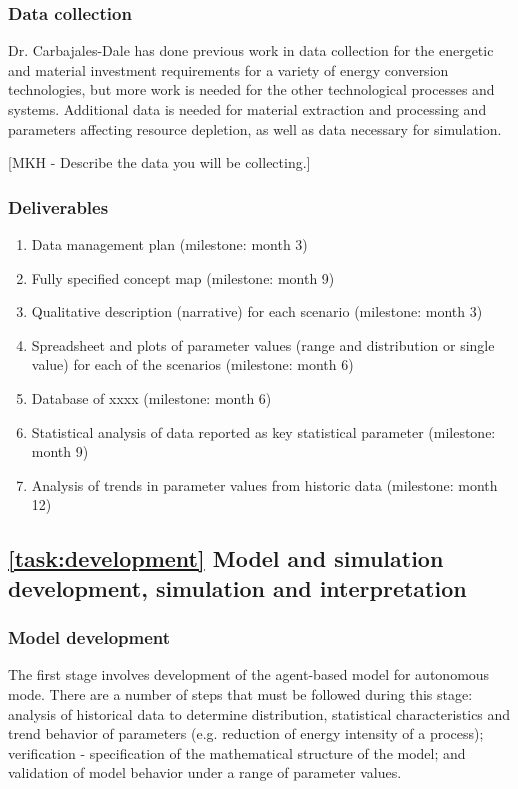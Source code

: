 \documentclass[11pt,a4paper]{article}
\begin{document}
\subsubsection{Data collection}

Dr. Carbajales-Dale has done previous work in 
data collection for the energetic and material investment requirements 
for a variety of energy conversion technologies, 
but more work is needed for the other 
technological processes and systems. 
Additional data is needed for material extraction and processing
and parameters affecting resource depletion,
as well as data necessary for simulation.

[MKH - Describe the data you will be collecting.]


\subsubsection{Deliverables}
\begin{enumerate}
\vspace{-9pt}
\setlength{\itemsep}{-3pt}
	\item	Data management plan (milestone: month 3)
	\item	Fully specified concept map (milestone: month 9)
	\item	Qualitative description (narrative) for each scenario (milestone: month 3)
	\item	Spreadsheet and plots of parameter values 
				(range and distribution or single value) 
				for each of the scenarios (milestone: month 6)
	\item	Database of xxxx (milestone: month 6)
	\item	Statistical analysis of data reported as key statistical parameter (milestone: month 9)
	\item	Analysis of trends in parameter values from historic data (milestone: month 12)
\end{enumerate}

\subsection{\ref{task:development} Model and simulation development, simulation and interpretation}
\label{sec:task:development}


\subsubsection{Model development}

The first stage involves 
development of the agent-based model for autonomous mode.
There are a number of steps 
that must be followed during this stage: 
analysis of historical data to determine distribution, 
statistical characteristics and trend behavior of parameters 
(e.g. reduction of energy intensity of a process); 
verification - specification of the mathematical structure of the model; 
and validation of model behavior under a range of parameter values.
\end{document}
